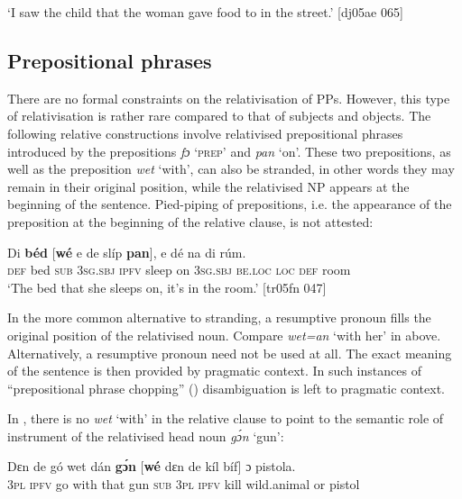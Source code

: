 \glt ‘I saw the child that the woman gave food to in the street.’ [dj05ae 065]
\z

\subsection{Prepositional phrases}

There are no formal constraints on the relativisation of PPs. However, this type of relativisation is rather rare compared to that of subjects and objects. The following relative constructions involve relativised prepositional phrases introduced by the prepositions \textit{fɔ} ‘\textsc{prep}’ and \textit{pan} ‘on’. These two prepositions, as well as the preposition \textit{wet} ‘with’, can also be stranded, in other words they may remain in their original position, while the relativised NP appears at the beginning of the sentence. Pied-piping of prepositions, i.e. the appearance of the preposition at the beginning of the relative clause, is not attested:


\ea%
    \label{ex:key:1437}
    \gll Di  \textbf{béd}  [\textbf{wé}  e    de  slíp    \textbf{pan}],  e    dé    na  di  rúm.\\
\textsc{def} bed \phantom{[}\textsc{sub} \textsc{3sg.sbj}  \textsc{ipfv} sleep  on  \textsc{3sg.sbj}  \textsc{be.loc}  \textsc{loc}  \textsc{def}  room\\

\glt ‘The bed that she sleeps on, it’s in the room.’ [tr05fn 047]
\z

In the more common alternative to stranding, a resumptive pronoun fills the original position of the relativised noun. Compare \textit{wet=an} ‘with her’ in  above. Alternatively, a resumptive pronoun need not be used at all. The exact meaning of the sentence is then provided by pragmatic context. In such instances of “prepositional phrase chopping” (\citealt{Tarallo1983,Tarallo1985}) disambiguation is left to pragmatic context. 


In , there is no \textit{wet} ‘with’ in the relative clause to point to the semantic role of instrument of the relativised head noun \textit{gɔ́n} ‘gun’:



\ea%
    \label{ex:key:1438}
    \gll Dɛn  de  gó  wet    dán    \textbf{gɔ́n}  [\textbf{wé}  dɛn  de  kíl  bíf]      ɔ  pistola.\\
\textsc{3pl}  \textsc{ipfv}  go  with    that    gun   \textsc{sub}  \textsc{3pl}  \textsc{ipfv}  kill  wild.animal  or  pistol\\


